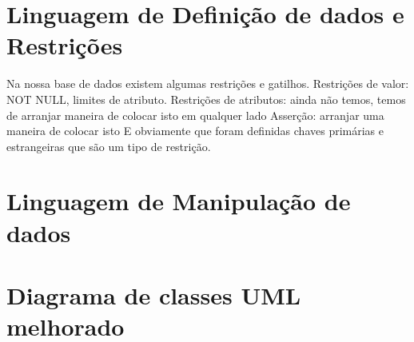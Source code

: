 \documentclass[a4paper]{article}
\begin{document}
\section{Linguagem de Definição de dados e Restrições}
Na nossa base de dados existem algumas restrições e gatilhos.
Restrições de valor: NOT NULL, limites de atributo.
Restrições de atributos: ainda não temos, temos de arranjar maneira de colocar isto em qualquer lado
Asserção: arranjar uma maneira de colocar isto
E obviamente que foram definidas chaves primárias e estrangeiras que são um tipo de restrição.

\section{Linguagem de Manipulação de dados}

\section{Diagrama de classes UML melhorado}
\end{document}
